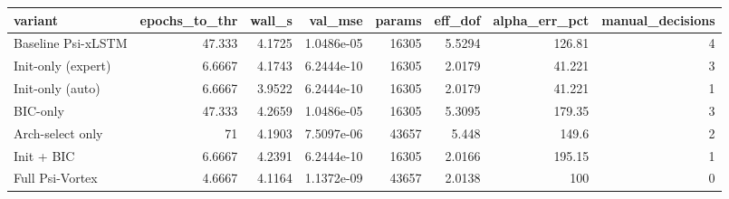 \begin{tabular}{lrrrrrrr}
\toprule
variant & epochs_to_thr & wall_s & val_mse & params & eff_dof & alpha_err_pct & manual_decisions \\
\midrule
Baseline Psi-xLSTM & 47.333 & 4.1725 & 1.0486e-05 & 16305 & 5.5294 & 126.81 & 4 \\
Init-only (expert) & 6.6667 & 4.1743 & 6.2444e-10 & 16305 & 2.0179 & 41.221 & 3 \\
Init-only (auto) & 6.6667 & 3.9522 & 6.2444e-10 & 16305 & 2.0179 & 41.221 & 1 \\
BIC-only & 47.333 & 4.2659 & 1.0486e-05 & 16305 & 5.3095 & 179.35 & 3 \\
Arch-select only & 71 & 4.1903 & 7.5097e-06 & 43657 & 5.448 & 149.6 & 2 \\
Init + BIC & 6.6667 & 4.2391 & 6.2444e-10 & 16305 & 2.0166 & 195.15 & 1 \\
Full Psi-Vortex & 4.6667 & 4.1164 & 1.1372e-09 & 43657 & 2.0138 & 100 & 0 \\
\bottomrule
\end{tabular}

